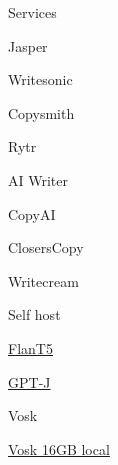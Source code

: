           Services

           
           
             
            \tightlist
             
              Jasper
             
           
             
            \tightlist
             
              Writesonic
             
           
             
            \tightlist
             
              Copysmith
             
           
             
            \tightlist
             
              Rytr
             
           
             
            \tightlist
             
              AI Writer
             
           
             
            \tightlist
             
              CopyAI
             
           
             
            \tightlist
             
              ClosersCopy
             
           
             
            \tightlist
             
              Writecream
             
           
         
          Self host

           
          \tightlist
           
            \href{https://huggingface.co/google/flan-t5-xxl?text=Translate+to+German\%3A++My+name+is+Arthur}{FlanT5}
           
            \href{https://devforth.io/blog/gpt-j-is-a-self-hosted-open-source-analog-of-gpt-3-how-to-run-in-docker/}{GPT-J}
           
            Vosk

             
            \tightlist
             
              \href{https://github.com/IlgarLunin/vosk-language-server}{Vosk
              16GB local}
             
